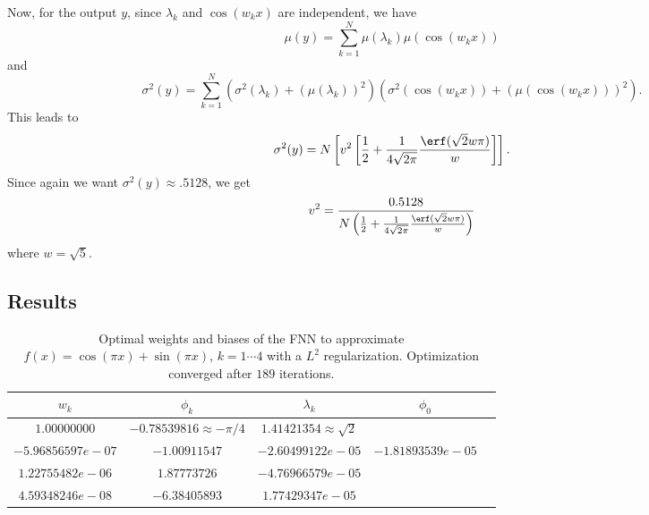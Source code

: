 \documentclass[AMS,STIX1COL]{WileyNJD-v2}
\begin{document}
Now, for the output $y$, since $\lambda_k$ and $\cos(w_kx)$ are independent, we have $$\mu(y) = \sum_{k = 1}^N \mu(\lambda_k) \mu(\cos(w_k x  ))$$ and $$\sigma^2(y) = \sum_{k = 1}^N \left(\sigma^2 (\lambda_k) + \left(\mu(\lambda_k)\right)^2\right) \left(\sigma^2(\cos(w_k x  ))+\left(\mu\left(\cos(w_k x)\right)\right)^2 \right).$$ This leads to
\begin{equation}\label{vary}
    \sigma^2(y) = N\left[ v^2\left[\frac{1}{2} + \frac{1}{4\sqrt{2\pi}}\frac{\erf(\sqrt{2}w\pi)}{w}\right] \right].
\end{equation}
Since again we want $\sigma^2(y) \approx .5128$, we get 
\begin{equation}\label{varweight2}
    v^2 = \frac{0.5128}{N\left(\frac{1}{2} + \frac{1}{4\sqrt{2\pi}}\frac{\erf(\sqrt{2}w\pi)}{w}\right)} 
\end{equation}
where $w = \sqrt{5}$.




\subsection{Results}\label{subsec:results}
 \begin{table}[!h]
  \begin{center}
\begin{tabular}{ |c|c|c|c|c| } 
\hline
$w_k$ & $\phi_k$ & $\lambda_k$& $\phi_0$ \\
\hline
$1.00000000$ & $-0.78539816 \approx -\pi/4$ &$1.41421354 \approx \sqrt{2}$& \\ 
$-5.96856597e-07$&$-1.00911547$ & $-2.60499122e-05$& $-1.81893539e-05$ \\ 
$1.22755482e-06$& $1.87773726$ & $-4.76966579e-05$& \\ 
$4.59348246e-08$& $-6.38405893 $ & $1.77429347e-05$& \\ 
\hline
\end{tabular}
\caption{Optimal weights and biases of the FNN to approximate $ f(x) = \cos(\pi x) + \sin(\pi x)$, $k = 1\cdots4$ with a $L^2$ regularization. Optimization converged after $189$ iterations.}\label{tabcossinL2}
\end{center}
\end{table}
\end{document}
